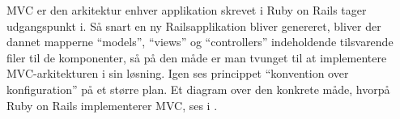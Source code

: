 
MVC er den arkitektur enhver applikation skrevet i Ruby on Rails tager udgangspunkt i. Så snart en ny Railsapplikation bliver genereret, bliver der dannet mapperne ``models'', ``views'' og ``controllers'' indeholdende tilsvarende filer til de komponenter, så på den måde er man tvunget til at implementere MVC-arkitekturen i sin løsning. Igen ses princippet ``konvention over konfiguration'' på et større plan. Et diagram over den konkrete måde, hvorpå Ruby on Rails implementerer MVC, ses i .
